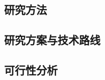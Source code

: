 \setlength{\abovedisplayskip}{0pt}
\setlength{\belowdisplayskip}{0pt}

\subsection{研究方法}

\subsection{研究方案与技术路线}

\subsection{可行性分析}

